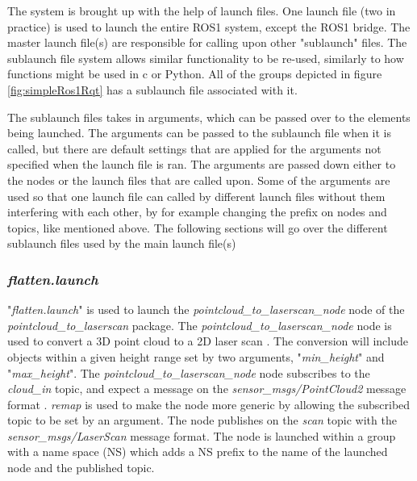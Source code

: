The system is brought up with the help of launch files. One launch file (two in practice) is used to launch the entire ROS1 system, except the ROS1 bridge. The master launch file(s) are responsible for calling upon other "sublaunch" files. The sublaunch file system allows similar functionality to be re-used, similarly to how functions might be used in c or Python. All of the groups depicted in figure \ref{fig:simpleRos1Rqt} has a sublaunch file associated with it. 

The sublaunch files takes in arguments, which can be passed over to the elements being launched. The arguments can be passed to the sublaunch file when it is called, but there are default settings that are applied for the arguments not specified when the launch file is ran. The arguments are passed down either to the nodes or the launch files that are called upon. Some of the arguments are used so that one launch file can called by different launch files without them interfering with each other, by for example changing the prefix on nodes and topics, like mentioned above. The following sections will go over the different sublaunch files used by the main launch file(s)

\subsubsection{\textit{flatten.launch}}\label{subsubsec:flatten.launch}
"\textit{flatten.launch}" is used to launch the \textit{pointcloud\_to\_laserscan\_node} 
node of the \textit{pointcloud\_to\_laserscan} package. The \textit{pointcloud\_to\_laserscan\_node} node is used to convert a 3D point cloud to a 2D laser scan \cite{pcl_ros}. The conversion will include objects within a given height range set by two arguments, "\textit{min\_height}" and "\textit{max\_height}". The \textit{pointcloud\_to\_laserscan\_node} node subscribes to the \textit{cloud\_in} topic, and expect a message on the \textit{sensor\_msgs/PointCloud2} message format \cite{pcl_ros}. \textit{remap} is used to make the node more generic by allowing the subscribed topic to be set by an argument. The node publishes on the \textit{scan} topic with the \textit{sensor\_msgs/LaserScan} message format. The node is launched within a group with a name space (NS) which adds a NS prefix to the name of the launched node and the published topic.

